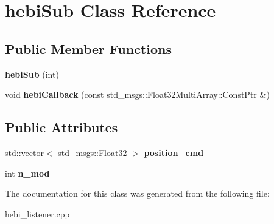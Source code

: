 \hypertarget{classhebiSub}{}\section{hebi\+Sub Class Reference}
\label{classhebiSub}
\subsection*{Public Member Functions}
\begin{DoxyCompactItemize}
\item 
\mbox{\label{classhebiSub_a4318a55cd9c3d04e707d4f967ce3fa8b}} 
{\bfseries hebi\+Sub} (int)
\item 
\mbox{\label{classhebiSub_a138b3fb698f64019f9066b6e22793cc4}} 
void {\bfseries hebi\+Callback} (const std\+\_\+msgs\+::\+Float32\+Multi\+Array\+::\+Const\+Ptr \&)
\end{DoxyCompactItemize}
\subsection*{Public Attributes}
\begin{DoxyCompactItemize}
\item 
\mbox{\label{classhebiSub_ab121e7d471d3a847d24b319eadca516b}} 
std\+::vector$<$ std\+\_\+msgs\+::\+Float32 $>$ {\bfseries position\+\_\+cmd}
\item 
\mbox{\label{classhebiSub_add86ca7606f19981d627f881103ba6bd}} 
int {\bfseries n\+\_\+mod}
\end{DoxyCompactItemize}


The documentation for this class was generated from the following file\+:\begin{DoxyCompactItemize}
\item 
hebi\+\_\+listener.\+cpp\end{DoxyCompactItemize}
